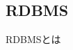 \documentclass[../../../main]{subfiles}
\begin{document}
    \subsection{RDBMS}\label{subsec:phraseology-rdbms}

    RDBMSとは
\end{document}
